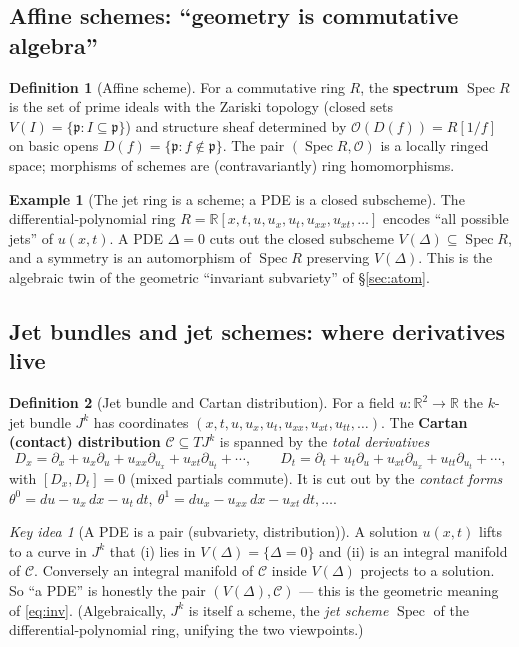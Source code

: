 \documentclass[11pt]{article}
\theoremstyle{definition}
\newtheorem{definition}{Definition}[section]
\newtheorem{example}{Example}[section]
\theoremstyle{remark}
\newtheorem*{keyidea}{Key idea}
\newcommand{\R}{\mathbb{R}}
\newcommand{\Spec}{\operatorname{Spec}}
\begin{document}
\subsection{Affine schemes: ``geometry is commutative algebra''}

\begin{definition}[Affine scheme]
For a commutative ring $R$, the \textbf{spectrum} $\Spec R$ is the set of prime ideals with the Zariski
topology (closed sets $V(I)=\{\mathfrak{p}:I\subseteq\mathfrak{p}\}$) and structure sheaf determined by
$\mathcal{O}(D(f))=R[1/f]$ on basic opens $D(f)=\{\mathfrak{p}:f\notin\mathfrak{p}\}$. The pair
$(\Spec R,\mathcal{O})$ is a locally ringed space; morphisms of schemes are (contravariantly) ring
homomorphisms.
\end{definition}

\begin{example}[The jet ring is a scheme; a PDE is a closed subscheme]
The differential-polynomial ring $R=\R[x,t,u,u_x,u_t,u_{xx},u_{xt},\dots]$ encodes ``all possible jets''
of $u(x,t)$. A PDE $\Delta=0$ cuts out the closed subscheme $V(\Delta)\subseteq\Spec R$, and a symmetry
is an automorphism of $\Spec R$ preserving $V(\Delta)$. This is the algebraic twin of the geometric
``invariant subvariety'' of \S\ref{sec:atom}.
\end{example}

\subsection{Jet bundles and jet schemes: where derivatives live}

\begin{definition}[Jet bundle and Cartan distribution]
For a field $u:\R^2\to\R$ the $k$-jet bundle $J^k$ has coordinates
$(x,t,u,u_x,u_t,u_{xx},u_{xt},u_{tt},\dots)$. The \textbf{Cartan (contact) distribution}
$\mathcal{C}\subseteq TJ^k$ is spanned by the \emph{total derivatives}
\[
D_x=\partial_x+u_x\partial_u+u_{xx}\partial_{u_x}+u_{xt}\partial_{u_t}+\cdots,\qquad
D_t=\partial_t+u_t\partial_u+u_{xt}\partial_{u_x}+u_{tt}\partial_{u_t}+\cdots,
\]
with $[D_x,D_t]=0$ (mixed partials commute). It is cut out by the \emph{contact forms}
$\theta^0=du-u_x\,dx-u_t\,dt,\ \theta^1=du_x-u_{xx}\,dx-u_{xt}\,dt,\dots$.
\end{definition}

\begin{keyidea}[A PDE is a pair (subvariety, distribution)]
A solution $u(x,t)$ lifts to a curve in $J^k$ that (i) lies in $V(\Delta)=\{\Delta=0\}$ and (ii) is an
integral manifold of $\mathcal{C}$. Conversely an integral manifold of $\mathcal{C}$ inside $V(\Delta)$
projects to a solution. So ``a PDE'' is honestly the pair $(V(\Delta),\mathcal{C})$ --- this is the
geometric meaning of \eqref{eq:inv}. (Algebraically, $J^k$ is itself a scheme, the \emph{jet scheme}
$\Spec$ of the differential-polynomial ring, unifying the two viewpoints.)
\end{keyidea}
\end{document}
